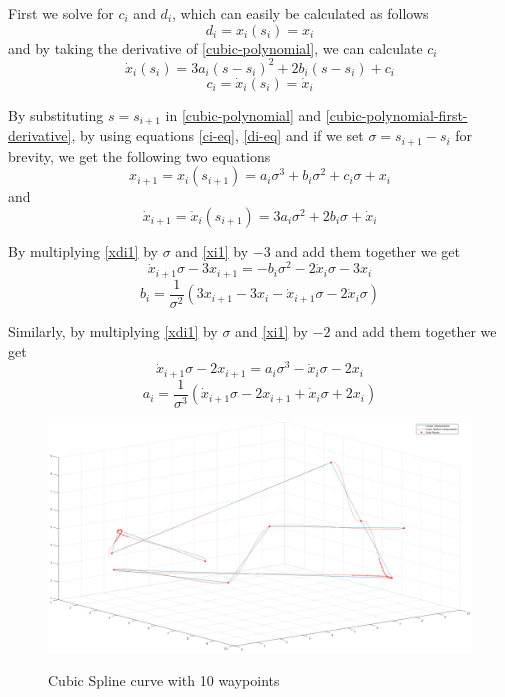 First we solve for $c_i$ and $d_i$, which can easily be calculated as follows
\begin{equation}
\label{di-eq}
d_i = x_i(s_i) = x_i
\end{equation}
and by taking the derivative of \ref{cubic-polynomial}, we can calculate $c_i$
\begin{equation}
\label{cubic-polynomial-first-derivative}
\dot{x}_i(s_i) = 3a_i(s-s_i)^2 + 2b_i(s-s_i) + c_i
\end{equation}
\begin{equation}
\label{ci-eq}
c_i = \dot{x}_i(s_i) = \dot{x}_i
\end{equation}

By substituting $s = s_{i+1}$ in \ref{cubic-polynomial} and \ref{cubic-polynomial-first-derivative}, by using equations \ref{ci-eq}, \ref{di-eq} and if 
we set $σ = s_{i+1}-s_i$ for brevity, we get the following two equations
\begin{equation}
\label{xi1}
x_{i+1} = x_i(s_{i+1}) = a_i σ^3 + b_i σ^2 + c_i σ + x_i
\end{equation}
and
\begin{equation}
\label{xdi1}
\dot{x}_{i+1} = \dot{x}_i(s_{i+1}) = 3a_i σ^2 + 2b_i σ + \dot{x}_i
\end{equation}

By multiplying \ref{xdi1} by $σ$ and \ref{xi1} by $-3$ and add them together we get
\[
\dot{x}_{i+1}σ - 3x_{i+1} = -b_iσ^2 -2\dot{x}_iσ - 3x_i
\]
\begin{equation}
b_i = \frac{1}{σ^2} (3x_{i+1} -3x_i - \dot{x}_{i+1}σ - 2\dot{x}_iσ)
\end{equation}

Similarly, by multiplying \ref{xdi1} by $σ$ and \ref{xi1} by $-2$ and add them together we get
\[
\dot{x}_{i+1}σ - 2x_{i+1} = a_iσ^3 -\dot{x}_iσ - 2x_i
\]
\begin{equation}
a_i = \frac{1}{σ^3} (\dot{x}_{i+1}σ - 2x_{i+1} + \dot{x}_iσ +2x_i)
\end{equation}

\begin{center}
\begin{figure}[H]
\centering
\includegraphics[width=\textwidth]{images/cubic-spline-path1.png}\\
\caption{Cubic Spline curve with 10 waypoints} 
\label{b-spline-explanation}
\end{figure}
\end{center}



